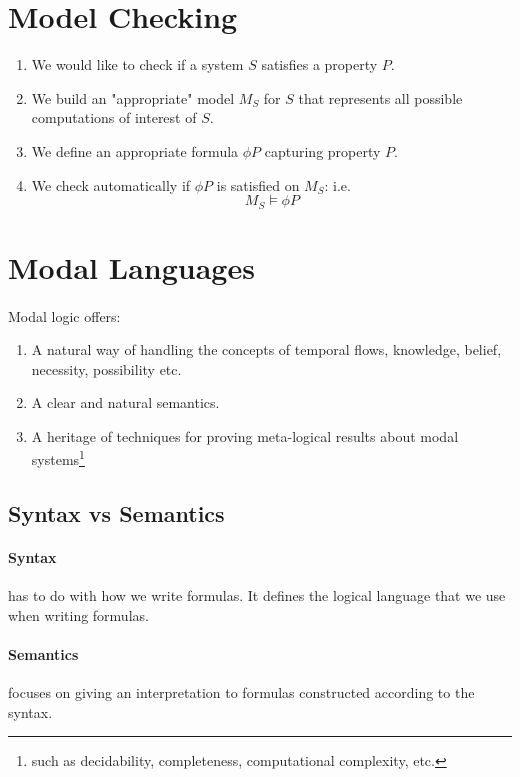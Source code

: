 \documentclass{article}
\theoremstyle{plain}
\theoremstyle{definition}
\begin{document}
\begin{multicols}{2}
\section{Model Checking}

\begin{enumerate}
\item We would like to check if a system $S$ satisfies a property $P$.
\item We build an "appropriate" model $M_S$ for $S$ that represents all possible computations of interest of $S$.
\item We define an appropriate formula $\phi P$ capturing property $P$.
\item We check automatically if $\phi P$ is satisfied on $M_S$: i.e. $$M_S \models \phi P$$
\end{enumerate}

\section{Modal Languages}

\paragraph{} Modal logic offers:
\begin{enumerate}
\item A natural way of handling the concepts of temporal flows, knowledge, belief, necessity, possibility etc.
\item A clear and natural semantics.
\item A heritage of techniques for proving meta-logical results about modal systems\footnote{such as decidability, completeness, computational complexity, etc.}
\end{enumerate}

\subsection{Syntax vs Semantics}

\paragraph{Syntax} has to do with how we write formulas. It defines the logical language that we use when writing formulas.

\paragraph{Semantics} focuses on giving an interpretation to formulas constructed according to the syntax.


\end{multicols}
\end{document}
